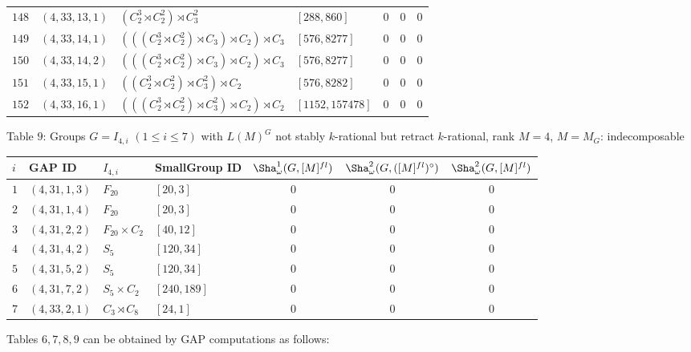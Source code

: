 \documentclass{amsart}
\theoremstyle{plain}
\theoremstyle{definition}
\theoremstyle{remark}
\begin{document}
{\begin{longtable}{llll|ccc}
$148$ & $( 4, 33, 13, 1 )$ & $(C_2^3 \rtimes C_2^2) \rtimes C_3^2$ & $[ 288, 860 ]$& $0$ & $0$ & $0$\\
$149$ & $( 4, 33, 14, 1 )$ & $(((C_2^3 \rtimes C_2^2) \rtimes C_3) \rtimes C_2) \rtimes C_3$ & $[ 576, 8277 ]$& $0$ & $0$ & $0$\\
$150$ & $( 4, 33, 14, 2 )$ & $(((C_2^3 \rtimes C_2^2) \rtimes C_3) \rtimes C_2) \rtimes C_3$ & $[ 576, 8277 ]$& $0$ & $0$ & $0$\\
$151$ & $( 4, 33, 15, 1 )$ & $((C_2^3 \rtimes C_2^2) \rtimes C_3^2) \rtimes C_2$ & $[ 576, 8282 ]$& $0$ & $0$ & $0$\\
$152$ & $( 4, 33, 16, 1 )$ & $(((C_2^3 \rtimes C_2^2) \rtimes C_3^2) \rtimes C_2) \rtimes C_2$ & $[ 1152, 157478 ]$ & $0$ & $0$ & $0$
\end{longtable}
}
\vspace*{2mm}

Table $9$: 
Groups $G=I_{4,i}$ $(1\leq i\leq 7)$ 
with $L(M)^G$ not stably $k$-rational but retract $k$-rational, 
rank $M=4$, $M=M_G$: indecomposable
{\small 
\begin{longtable}{llll|ccc}
$i$ & GAP ID & $I_{4,i}$ & SmallGroup ID 
& $\Sha^1_\omega(G,[M]^{fl})$ & $\Sha^2_\omega(G,([M]^{fl})^\circ)$ & $\Sha^2_\omega(G,[M]^{fl})$\\\hline
\endfirsthead
$1$ & $( 4, 31, 1, 3 )$ & $F_{20}$ & $[ 20, 3 ]$& $0$ & $0$ & $0$\\
$2$ & $( 4, 31, 1, 4 )$ & $F_{20}$ & $[ 20, 3 ]$& $0$ & $0$ & $0$\\
$3$ & $( 4, 31, 2, 2 )$ & $F_{20} \times C_2$ & $[ 40, 12 ]$& $0$ & $0$ & $0$\\
$4$ & $( 4, 31, 4, 2 )$ & $S_5$ & $[ 120, 34 ]$& $0$ & $0$ & $0$\\
$5$ & $( 4, 31, 5, 2 )$ & $S_5$ & $[ 120, 34 ]$& $0$ & $0$ & $0$\\
$6$ & $( 4, 31, 7, 2 )$ & $S_5 \times C_2$ & $[ 240, 189 ]$& $0$ & $0$ & $0$\\ 
$7$ & $( 4, 33, 2, 1 )$ & $C_3 \rtimes C_8$ & $[ 24, 1 ]$ & $0$ & $0$ & $0$
\end{longtable}
}
\vspace*{2mm}

Tables $6, 7, 8, 9$ can be obtained by GAP computations as follows: 
\end{document}
